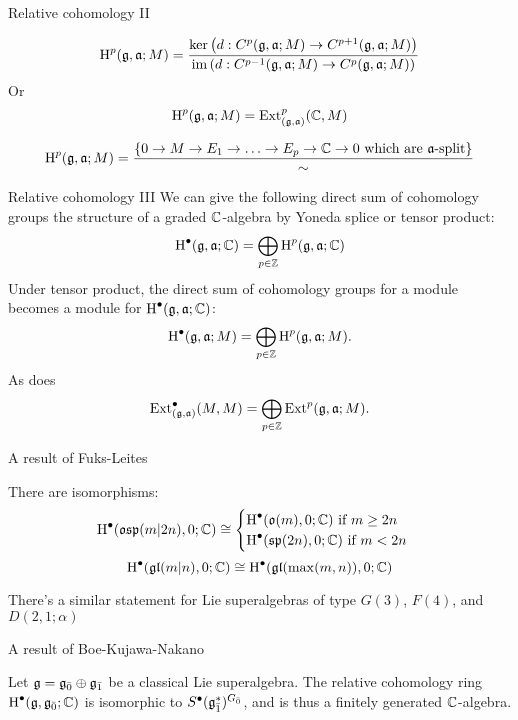 \documentclass[handout]{beamer}
\begin{document}
\begin{frame}{Relative cohomology II}\pause
  \begin{definition}
    \[
      \operatorname{H}^p(\mathfrak{g},\mathfrak{a};M) = \frac{\ker\left(d:C^p(\mathfrak{g},\mathfrak{a};M) \to C^{p+1}(\mathfrak{g},\mathfrak{a};M)\right)}{\operatorname{im}\left(d: C^{p-1}(\mathfrak{g},\mathfrak{a};M) \to C^p(\mathfrak{g},\mathfrak{a};M)\right)}
    \]
    \pause Or
    \[
      \operatorname{H}^p(\mathfrak{g},\mathfrak{a};M) = \operatorname{Ext}^p_{(\mathfrak{g},\mathfrak{a})}(\mathbb{C},M)
    \]
  \end{definition}\pause
  \[
    \operatorname{H}^p(\mathfrak{g},\mathfrak{a};M) = \frac{\left\{0 \to M \to E_1 \to \ldots \to E_p \to \mathbb{C} \to 0 \text{ which are $\mathfrak{a}$-split}\right\}}{\sim}
  \]
\end{frame}

\begin{frame}{Relative cohomology III}\pause
  We can give the following direct sum of cohomology groups the structure of a graded $\mathbb{C}$-algebra by Yoneda splice or tensor product:
  \[
    \operatorname{H}^\bullet(\mathfrak{g},\mathfrak{a};\mathbb{C}) = \bigoplus_{p \in \mathbb{Z}} \operatorname{H}^p(\mathfrak{g},\mathfrak{a};\mathbb{C})
  \]\pause
  Under tensor product, the direct sum of cohomology groups for a module becomes a module for $\operatorname{H}^\bullet(\mathfrak{g},\mathfrak{a};\mathbb{C})$:
  \[
    \operatorname{H}^\bullet(\mathfrak{g},\mathfrak{a};M) = \bigoplus_{p \in \mathbb{Z}} \operatorname{H}^p(\mathfrak{g},\mathfrak{a};M).
  \]\pause
  As does
  \[
    \operatorname{Ext}^\bullet_{(\mathfrak{g},\mathfrak{a})}(M,M) = \bigoplus_{p \in \mathbb{Z}} \operatorname{Ext}^p(\mathfrak{g},\mathfrak{a};M).
  \]
  
\end{frame}

\begin{frame}{A result of Fuks-Leites}\pause
  \begin{theorem}
    There are isomorphisms:
    \[
      \operatorname{H}^\bullet(\mathfrak{osp}(m|2n),0;\mathbb{C}) \cong
      \begin{cases}
        \operatorname{H}^\bullet(\mathfrak{o}(m),0;\mathbb{C}) \text{ if } m \geq 2n \\
        \operatorname{H}^\bullet(\mathfrak{sp}(2n),0;\mathbb{C}) \text{ if } m < 2n
      \end{cases}
    \]
    \[
      \operatorname{H}^\bullet(\mathfrak{gl}(m|n),0;\mathbb{C}) \cong \operatorname{H}^\bullet(\mathfrak{gl}(\max(m,n)),0;\mathbb{C})
    \]
  \end{theorem}\pause
  There's a similar statement for Lie superalgebras of type $G(3)$, $F(4)$, and $D(2,1;\alpha)$
\end{frame}

\begin{frame}{A result of Boe-Kujawa-Nakano}

  \begin{theorem}
    Let $\mathfrak{g} = {\mathfrak{g}}_{\bar{0}} \oplus {\mathfrak{g}}_{\bar{1}}$ be a classical Lie superalgebra. The relative cohomology ring $\operatorname{H}^\bullet(\mathfrak{g},{\mathfrak{g}}_{\bar{0}};\mathbb{C})$ is isomorphic to $S^\bullet({\mathfrak{g}}_{\bar{1}}^*)^{{G}_{\bar{0}}}$, and is thus a finitely generated $\mathbb{C}$-algebra.
  \end{theorem}
\end{frame}
\end{document}
